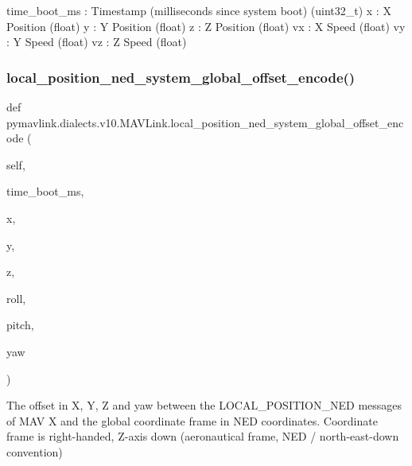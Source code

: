 \begin{DoxyVerb}
\begin{DoxyVerb}
\begin{DoxyVerb}
\begin{DoxyVerb}
\begin{DoxyVerb}
time_boot_ms              : Timestamp (milliseconds since system boot) (uint32_t)
x                         : X Position (float)
y                         : Y Position (float)
z                         : Z Position (float)
vx                        : X Speed (float)
vy                        : Y Speed (float)
vz                        : Z Speed (float)\end{DoxyVerb}
 \mbox{\label{classpymavlink_1_1dialects_1_1v10_1_1MAVLink_adb2f5012c91d6329242c439fd4ae6d83}} 
\subsubsection{\texorpdfstring{local\+\_\+position\+\_\+ned\+\_\+system\+\_\+global\+\_\+offset\+\_\+encode()}{local\_position\_ned\_system\_global\_offset\_encode()}}
{\footnotesize\ttfamily def pymavlink.\+dialects.\+v10.\+M\+A\+V\+Link.\+local\+\_\+position\+\_\+ned\+\_\+system\+\_\+global\+\_\+offset\+\_\+encode (\begin{DoxyParamCaption}\item[{}]{self,  }\item[{}]{time\+\_\+boot\+\_\+ms,  }\item[{}]{x,  }\item[{}]{y,  }\item[{}]{z,  }\item[{}]{roll,  }\item[{}]{pitch,  }\item[{}]{yaw }\end{DoxyParamCaption})}

\begin{DoxyVerb}The offset in X, Y, Z and yaw between the LOCAL_POSITION_NED messages
of MAV X and the global coordinate frame in NED
coordinates. Coordinate frame is right-handed, Z-axis
down (aeronautical frame, NED / north-east-down
convention)


\end{DoxyVerb}
\end{DoxyVerb}
\end{DoxyVerb}
\end{DoxyVerb}
\end{DoxyVerb}
